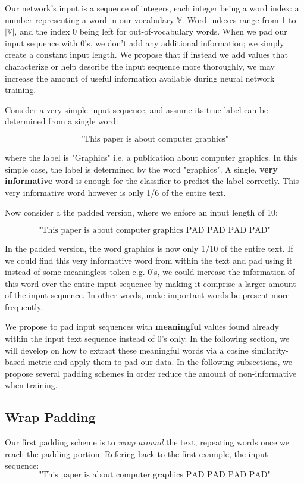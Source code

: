 Our network's input is a sequence of integers, each integer being a word index: a number representing a word in our vocabulary $\mathbb{V}$.
Word indexes range from 1 to $|\mathbb{V}|$, and the index 0 being left for out-of-vocabulary words.
When we pad our input sequence with 0’s, we don’t add any additional information; we
simply create a constant input length. We propose that if instead we add values that characterize or help
describe the input sequence more thoroughly, we may increase the amount of useful information
available during neural network training.

Consider a very simple input sequence, and assume its true label can be determined
from a single word:

\[\text{"This paper is about computer graphics"}\]

where the label is "Graphics" i.e. a publication about computer graphics.
In this simple case, the label is determined by the word "graphics". A single, \textbf{very
informative} word is enough for the classifier to predict the label correctly. This very
informative word however is only 1/6 of the entire text.

Now consider a the padded version, where we enfore an input length of 10:

\[\text{"This paper is about computer graphics PAD PAD PAD PAD"}\]

In the padded version, the word graphics is now only 1/10 of the entire text. If we
could find this very informative word from within the text and pad using it instead of some
meaningless token e.g. 0's, we could increase the information of this word over the entire
input sequence by making it comprise a larger amount of the input sequence. In other
words, make important words be present more frequently.

We propose to pad input sequences with \textbf{meaningful} values found already within the
input text sequence instead of 0's only. In the following section, we will develop on how to
extract these meaningful words via a cosine similarity-based metric and apply them to pad
our data. In the following subsections, we propose several padding schemes in order reduce the amount of non-informative
when training.

\subsection{Wrap Padding}
Our first padding scheme is to \textit{wrap around} the text, repeating words once we reach the padding portion.
Refering back to the first example, the input sequence:
\[\text{"This paper is about computer graphics PAD PAD PAD PAD"}\]


